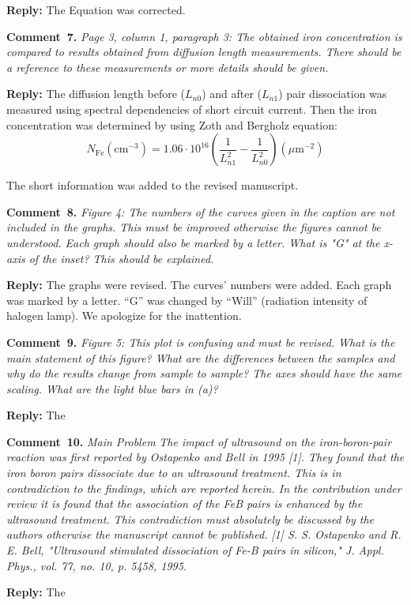 \documentclass[aip,jap,preprint]{revtex4-1}
\begin{document}
\noindent
\textcolor[rgb]{0.51,0.00,0.00}{\textbf{Reply:}}
The Equation was corrected.

\vspace{1cm}
\noindent
\textcolor[rgb]{0.00,0.50,1.00}{\textbf{Comment~7.}}
\emph{Page 3, column 1, paragraph 3: The obtained iron concentration is compared to results obtained from diffusion length measurements. There should be a reference to these measurements or more details should be given.}

\noindent
\textcolor[rgb]{0.51,0.00,0.00}{\textbf{Reply:}}
The diffusion length before ($L_{n0}$) and after ($L_{n1}$) pair dissociation was measured using spectral dependencies of short circuit current\cite{LnIscMethod}.
Then the iron concentration was determined by using Zoth and Bergholz\cite{FeB_Zong} equation:
\begin{equation}
  N_\mathrm{Fe}(\mathrm{cm}^{-3})=1.06\cdot10^{16}\left(\frac{1}{L_{n1}^2}-\frac{1}{L_{n0}^2}\right)(\mu\mathrm{m}^{-2})
\end{equation}

The short information was added to the revised manuscript.

\vspace{1cm}
\noindent
\textcolor[rgb]{0.00,0.50,1.00}{\textbf{Comment~8.}}
\emph{Figure 4: The numbers of the curves given in the caption are not included in the graphs. This must be improved otherwise the figures cannot be understood. Each graph should also be marked by a letter. What is "G" at the x-axis of the inset? This should be explained. }


\noindent
\textcolor[rgb]{0.51,0.00,0.00}{\textbf{Reply:}}
The graphs were revised.
The curves' numbers were added.
Each graph was marked by a letter.
``G'' was changed by ``Will'' (radiation intensity of halogen lamp).
We apologize for the inattention.


\vspace{1cm}
\noindent
\textcolor[rgb]{0.00,0.50,1.00}{\textbf{Comment~9.}}
\emph{Figure 5: This plot is confusing and must be revised. What is the main statement of this figure? What are the differences between the samples and why do the results change from sample to sample? The axes should have the same scaling. What are the light blue bars in (a)? }

\noindent
\textcolor[rgb]{0.51,0.00,0.00}{\textbf{Reply:}}
The

\vspace{1cm}
\noindent
\textcolor[rgb]{0.00,0.50,1.00}{\textbf{Comment~10.}}
\emph{Main Problem}
\emph{The impact of ultrasound on the iron-boron-pair reaction was first reported by Ostapenko and Bell in 1995 [1]. They found that the iron boron pairs dissociate due to an ultrasound treatment. This is in contradiction to the findings, which are reported herein. In the contribution under review it is found that the association of the FeB pairs is enhanced by the ultrasound treatment. This contradiction must absolutely be discussed by the authors otherwise the manuscript cannot be published.}
\emph{
[1] S. S. Ostapenko and R. E. Bell, "Ultrasound stimulated dissociation of Fe-B pairs in silicon," J. Appl. Phys., vol. 77, no. 10, p. 5458, 1995.
 }

\noindent
\textcolor[rgb]{0.51,0.00,0.00}{\textbf{Reply:}}
The



\end{document}
